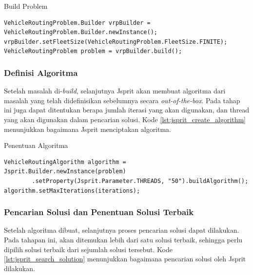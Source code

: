 \begin{listing}
	\caption{Build Problem}
	\label{lst:jsprit_build_problem}
	\begin{verbatim}
VehicleRoutingProblem.Builder vrpBuilder = VehicleRoutingProblem.Builder.newInstance();
vrpBuilder.setFleetSize(VehicleRoutingProblem.FleetSize.FINITE);
VehicleRoutingProblem problem = vrpBuilder.build();
	\end{verbatim}
\end{listing}


\subsubsection{Definisi Algoritma}
Setelah masalah di-\textit{build}, selanjutnya Jsprit akan membuat algoritma dari masalah yang telah didefinisikan sebelumnya secara \textit{out-of-the-box}. Pada tahap ini juga dapat ditentukan berapa jumlah iterasi yang akan digunakan, dan thread yang akan digunakan dalam pencarian solusi. Kode \ref{lst:jsprit_create_algorithm} menunjukkan bagaimana Jsprit menciptakan algoritma.


\begin{listing}
	\caption{Penentuan Algoritma}
	\label{lst:jsprit_create_algorithm}
	\begin{verbatim}
VehicleRoutingAlgorithm algorithm = Jsprit.Builder.newInstance(problem)
        .setProperty(Jsprit.Parameter.THREADS, "50").buildAlgorithm();
algorithm.setMaxIterations(iterations);
	\end{verbatim}
\end{listing}


\subsubsection{Pencarian Solusi dan Penentuan Solusi Terbaik}
Setelah algoritma dibuat, selanjutnya proses pencarian solusi dapat dilakukan. Pada tahapan ini, akan ditemukan lebih dari satu solusi terbaik, sehingga perlu dipilih solusi terbaik dari sejumlah solusi tersebut. Kode \ref{lst:jsprit_search_solution} menunjukkan bagaimana pencarian solusi oleh Jsprit dilakukan.


